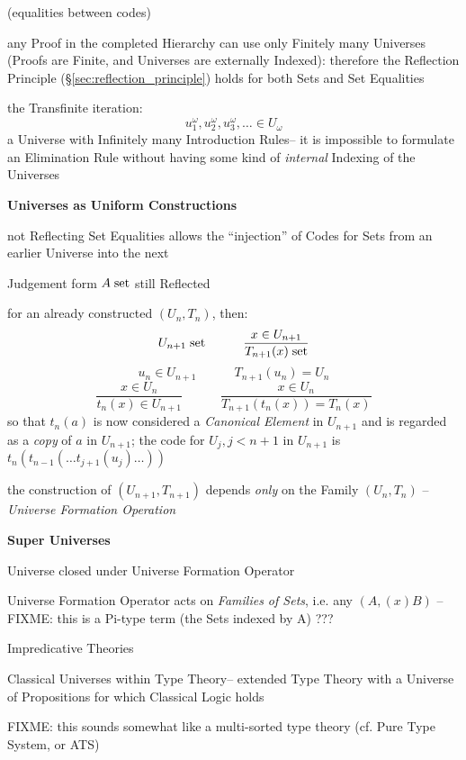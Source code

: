 (equalities between codes) %

any Proof in the completed Hierarchy can use only Finitely many
Universes (Proofs are Finite, and Universes are externally Indexed):
therefore the Reflection Principle (\S\ref{sec:reflection_principle})
holds for both Sets and Set Equalities

the Transfinite iteration:
\[
  u_1^\omega, u_2^\omega, u_3^\omega, \ldots \in U_\omega
\]
a Universe with Infinitely many Introduction Rules-- it is impossible
to formulate an Elimination Rule without having some kind of
\emph{internal} Indexing of the Universes


\textbf{Universes as Uniform Constructions}

not Reflecting Set Equalities allows the ``injection'' of Codes for
Sets from an earlier Universe into the next

Judgement form $A \;\mathrm{set}$ still Reflected

for an already constructed $(U_n,T_n)$, then:
\[
  U_{n+1} \;\mathrm{set} \quad\quad\quad \frac{x \in U_{n+1}}{T_{n+1}(x) \;\mathrm{set}}
\] \[
  u_n \in U_{n+1} \quad\quad\quad T_{n+1}(u_n) = U_n
\] \[
  \frac{x \in U_n}{t_n(x) \in U_{n+1}} \quad\quad\quad
    \frac{x \in U_n}{T_{n+1}(t_n(x)) = T_n(x)}
\]
so that $t_n(a)$ is now considered a \emph{Canonical Element} in
$U_{n+1}$ and is regarded as a \emph{copy} of $a$ in $U_{n+1}$; the
code for $U_j, j < n+1$ in $U_{n+1}$ is $t_n(t_{n-1}(\ldots
t_{j+1}(u_j) \ldots))$

the construction of $(U_{n+1},T_{n+1})$ depends \emph{only} on the
Family $(U_n,T_n)$ -- \emph{Universe Formation Operation}


\textbf{Super Universes}

Universe closed under Universe Formation Operator

Universe Formation Operator acts on \emph{Families of Sets}, i.e. any
$(A, (x)B)$ -- FIXME: this is a Pi-type term (the Sets indexed by A)
???


Impredicative Theories

Classical Universes within Type Theory-- extended Type Theory with a
Universe of Propositions for which Classical Logic holds

FIXME: this sounds somewhat like a multi-sorted type theory (cf. Pure
Type System, or ATS)



\endgroup %




